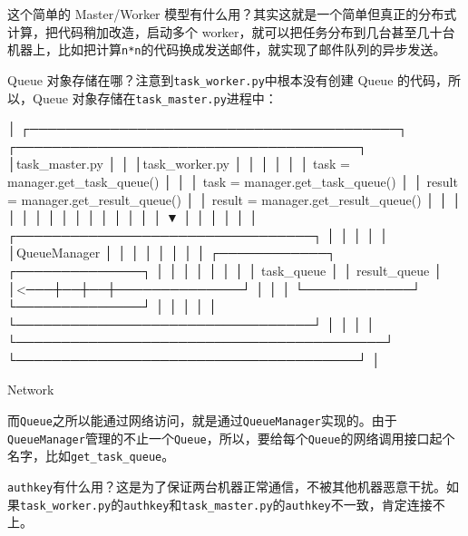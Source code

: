 这个简单的 Master/Worker
模型有什么用？其实这就是一个简单但真正的分布式计算，把代码稍加改造，启动多个
worker，就可以把任务分布到几台甚至几十台机器上，比如把计算\texttt{n*n}的代码换成发送邮件，就实现了邮件队列的异步发送。

Queue 对象存储在哪？注意到\texttt{task\_worker.py}中根本没有创建 Queue
的代码，所以，Queue 对象存储在\texttt{task\_master.py}进程中：

\begin{pythoncode}
                                             │
┌─────────────────────────────────────────┐     ┌──────────────────────────────────────┐
│task_master.py                           │  │  │task_worker.py                        │
│                                         │     │                                      │
│  task = manager.get_task_queue()        │  │  │  task = manager.get_task_queue()     │
│  result = manager.get_result_queue()    │     │  result = manager.get_result_queue() │
│              │                          │  │  │              │                       │
│              │                          │     │              │                       │
│              ▼                          │  │  │              │                       │
│  ┌─────────────────────────────────┐    │     │              │                       │
│  │QueueManager                     │    │  │  │              │                       │
│  │ ┌────────────┐ ┌──────────────┐ │    │     │              │                       │
│  │ │ task_queue │ │ result_queue │ │<───┼──┼──┼──────────────┘                       │
│  │ └────────────┘ └──────────────┘ │    │     │                                      │
│  └─────────────────────────────────┘    │  │  │                                      │
└─────────────────────────────────────────┘     └──────────────────────────────────────┘
                                             │

                                          Network
\end{pythoncode}

而\texttt{Queue}之所以能通过网络访问，就是通过\texttt{QueueManager}实现的。由于\texttt{QueueManager}管理的不止一个\texttt{Queue}，所以，要给每个\texttt{Queue}的网络调用接口起个名字，比如\texttt{get\_task\_queue}。

\texttt{authkey}有什么用？这是为了保证两台机器正常通信，不被其他机器恶意干扰。如果\texttt{task\_worker.py}的\texttt{authkey}和\texttt{task\_master.py}的\texttt{authkey}不一致，肯定连接不上。

